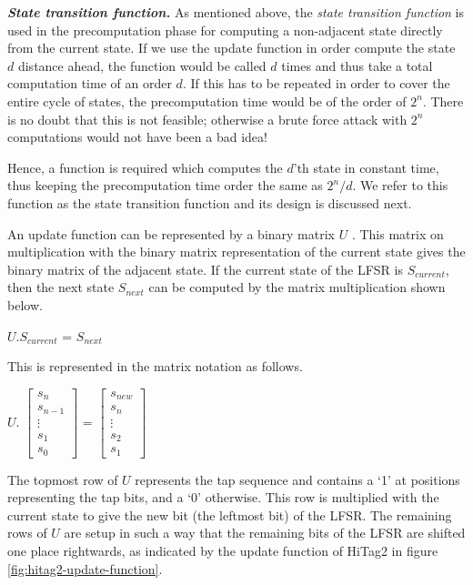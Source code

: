 \noindent \textit{\textbf{State transition function.}} As mentioned above, the \emph{state transition function} is used in the precomputation phase for computing a non-adjacent state directly from the current state. If we use the update function in order compute the state $d$ distance ahead, the function would be called $d$ times and thus take a total computation time of an order $d$. If this has to be repeated in order to cover the entire cycle of states, the precomputation time would be of the order of $2^n$. There is no doubt that this is not feasible; otherwise a brute force attack with $2^n$ computations would not have been a bad idea! 

Hence, a function is required which computes the $d$'th state in constant time, thus keeping the precomputation time order the same as $2^{n}/d$. We refer to this function as the state transition function and its design is discussed next. 

An update function can be represented by a binary matrix $U$ \cite{trappe2005icc}\cite{erik-discussions}. This matrix on multiplication with the binary matrix representation of the current state gives the binary matrix of the adjacent state. If the current state of the LFSR is $S_{current}$, then the next state $S_{next}$ can be computed by the matrix multiplication shown below.
\begin{center}
$U . S_{current}$ = $S_{next}$\\
\end{center}
This is represented in the matrix notation as follows.
\begin{center}
$U.$
$\begin{bmatrix}
s_{n} \\
s_{n-1} \\
\vdots \\
s_{1} \\
s_{0}
\end{bmatrix}$ = 
$\begin{bmatrix}
s_{new} \\
s_{n} \\
\vdots \\
s_{2} \\
s_{1}
\end{bmatrix}$
\end{center}
The topmost row of $U$ represents the tap sequence and contains a `1' at positions representing the tap bits, and a `0' otherwise. This row is multiplied with the current state to give the new bit (the leftmost bit) of the LFSR. The remaining rows of $U$ are setup in such a way that the remaining bits of the LFSR are shifted one place rightwards, as indicated by the update function of HiTag2 in figure \ref{fig:hitag2-update-function}. 

